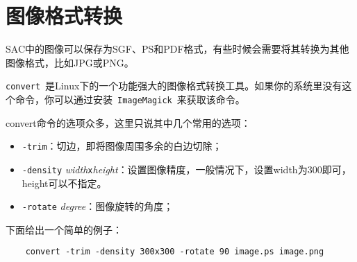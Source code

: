 \section{图像格式转换}
\label{sec:format-conversion}

SAC中的图像可以保存为SGF、PS和PDF格式，有些时候会需要将其转换为其他图像格式，比如JPG或PNG。

\verb+convert+~是Linux下的一个功能强大的图像格式转换工具。如果你的系统里没有这个命令，你可以通过安装~\verb+ImageMagick+~来获取该命令。

convert命令的选项众多，这里只说其中几个常用的选项：

\begin{itemize}
\item \verb+-trim+：切边，即将图像周围多余的白边切除；
\item \verb+-density+ \textit{width}\verb+x+\textit{height}：设置图像精度，一般情况下，设置width为300即可，height可以不指定。
\item \verb+-rotate+ \textit{degree}：图像旋转的角度；
\end{itemize}

下面给出一个简单的例子：

\begin{verbatim}
    convert -trim -density 300x300 -rotate 90 image.ps image.png
\end{verbatim}

